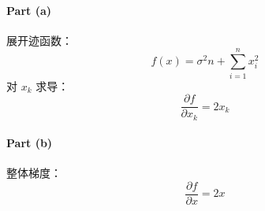 \paragraph{Part (a)}  
展开迹函数：
\[
f(x) = \sigma^2 n + \sum_{i=1}^n x_i^2
\]
对 \(x_k\) 求导：
\[
\frac{\partial f}{\partial x_k} = 2x_k
\]

\paragraph{Part (b)}  
整体梯度：
\[
\frac{\partial f}{\partial x} = 2x
\]